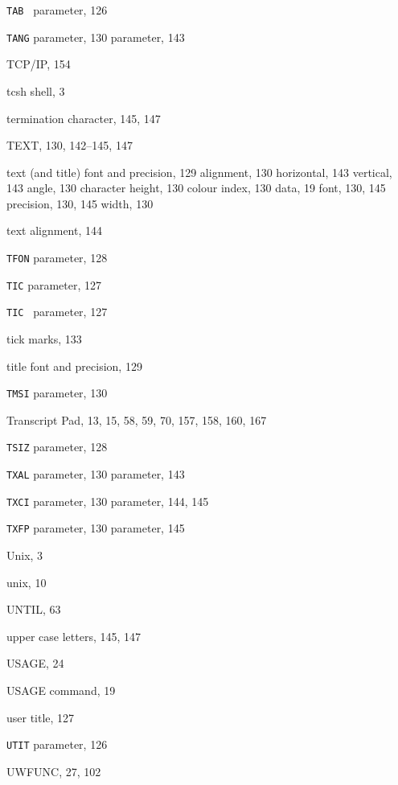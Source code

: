 \begin{theindex}
  \indexspace

  \item {\tt TAB }
     parameter, 126
  \item {\tt TANG}
     parameter, 130
     parameter, 143
  \item TCP/IP, 154
  \item tcsh shell, 3
  \item termination character, 145, 147
  \item {\ttfamily  TEXT}, 130, 142--145, 147
  \item text
    \subitem (and title) font and precision, 129
    \subitem alignment, 130
      \subsubitem horizontal, 143
      \subsubitem vertical, 143
    \subitem angle, 130
    \subitem character height, 130
    \subitem colour index, 130
    \subitem data, 19
    \subitem font, 130, 145
    \subitem precision, 130, 145
    \subitem width, 130
  \item text alignment, 144
  \item {\tt TFON}
     parameter, 128
  \item {\tt TIC}
     parameter, 127
  \item {\tt TIC }
     parameter, 127
  \item tick marks, 133
  \item title font and precision, 129
  \item {\tt TMSI}
     parameter, 130
  \item Transcript Pad, 13, 15, 58, 59, 70, 157, 158, 160, 167
  \item {\tt TSIZ}
     parameter, 128
  \item {\tt TXAL}
     parameter, 130
     parameter, 143
  \item {\tt TXCI}
     parameter, 130
     parameter, 144, 145
  \item {\tt TXFP}
     parameter, 130
     parameter, 145

  \indexspace

  \item Unix, 3
  \item unix, 10
  \item {\ttfamily  UNTIL}, 63
  \item upper case letters, 145, 147
  \item {\ttfamily  USAGE}, 24
  \item USAGE command, 19
  \item user
    \subitem title, 127
  \item {\tt UTIT}
     parameter, 126
  \item {\ttfamily  UWFUNC}, 27, 102


\end{theindex}

